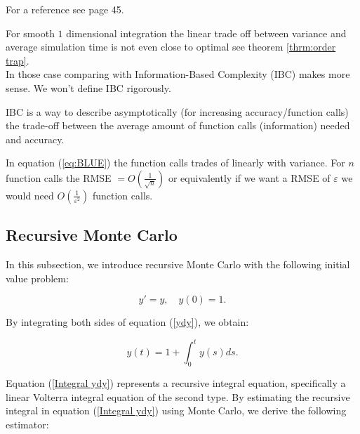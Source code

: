 \documentclass[a4paper,12pt]{article}
\begin{document}
\begin{related}
    For a reference see \cite{veach_robust_1997} page 45.
\end{related}

For smooth $1$ dimensional integration the linear trade off between
variance and average simulation time is not even close to optimal see
theorem \ref{thrm:order trap}. \\
In those case comparing with Information-Based Complexity (IBC)
makes more sense. We won't define IBC rigorously.

\begin{definition}
    IBC is a way to describe asymptotically (for increasing accuracy/function calls)
    the trade-off between the average amount of function calls (information)
    needed and accuracy.
\end{definition}

\begin{example}
    In equation (\ref{eq:BLUE}) the function calls trades of
    linearly with variance. For $n$ function calls
    the RMSE $= O\left(\frac{1}{\sqrt{n}}\right)$ or equivalently if we want a
    RMSE of $\varepsilon$ we would need $O\left(\frac{1}{\varepsilon^{2}}\right)$
    function calls.
\end{example}

\subsection{Recursive Monte Carlo}
In this subsection, we introduce recursive Monte Carlo
with the following  initial value problem:

\begin{equation} \label{ydy}
    y' = y, \quad y(0) = 1.
\end{equation}

By integrating both sides of equation (\ref{ydy}), we obtain:

\begin{equation} \label{Integral ydy}
    y(t) = 1 + \int_{0}^{t} y(s) ds.
\end{equation}

Equation (\ref{Integral ydy}) represents a recursive integral equation,
specifically a linear Volterra integral equation of the second type.
By estimating the recursive integral in equation (\ref{Integral ydy})
using Monte Carlo, we derive the following estimator:
\end{document}
